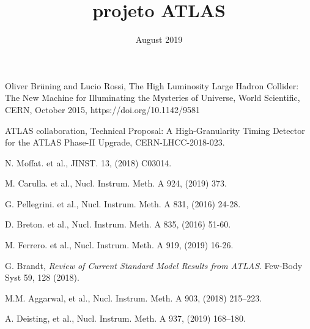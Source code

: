 \documentclass{report}
\title{projeto ATLAS}
\date{August 2019}
\begin{document}





\tableofcontents



%



\begin{thebibliography}{9}

 Oliver Brüning and Lucio Rossi, The High Luminosity Large Hadron Collider: The New Machine for Illuminating the Mysteries of Universe, World Scientific, CERN, October 2015,  https://doi.org/10.1142/9581

 ATLAS collaboration, Technical Proposal: A High-Granularity Timing Detector for the ATLAS Phase-II Upgrade, CERN-LHCC-2018-023.

 N. Moffat. et al., JINST. 13, (2018) C03014.

 M. Carulla. et al., Nucl. Instrum. Meth. A 924, (2019) 373. 

%
 G. Pellegrini. et al., Nucl. Instrum. Meth. A 831, (2016) 24-28.

 D. Breton. et al., Nucl. Instrum. Meth. A 835, (2016) 51-60.

 M. Ferrero. et al., Nucl. Instrum. Meth. A 919, (2019) 16-26.
%

 G. Brandt, \textit{Review of Current Standard Model Results from ATLAS}. Few-Body Syst 59, 128 (2018). 






 M.M. Aggarwal, et al., Nucl. Instrum. Meth. A 903, (2018) 215–223. 

 A. Deisting, et al., Nucl. Instrum. Meth. A 937, (2019) 168–180.



\end{thebibliography}
\end{document}
